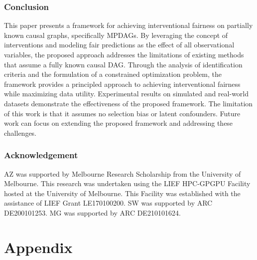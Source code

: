 \documentclass{article} %
\begin{document}
\section{Conclusion}
This paper presents a framework for achieving interventional fairness on partially known causal graphs, specifically MPDAGs. By leveraging the concept of interventions and modeling fair predictions as the effect of all observational variables, the proposed approach addresses the limitations of existing methods that assume a fully known causal DAG. Through the analysis of identification criteria and the formulation of a constrained optimization problem, the framework provides a principled approach to achieving interventional fairness while maximizing data utility. %
Experimental results on simulated and real-world datasets demonstrate the effectiveness of the proposed framework. The limitation of this work is that it assumes no selection bias or latent confounders. Future work can focus on extending the proposed framework and addressing these challenges.

\section{Acknowledgement}

AZ was supported by Melbourne Research Scholarship from the University of Melbourne. This research was undertaken using the LIEF HPC-GPGPU Facility hosted at the University of Melbourne. This Facility was established with the assistance of LIEF Grant LE170100200.
SW was supported by ARC DE200101253. 
MG was supported by ARC DE210101624.  %




\clearpage
\appendix

\part{Appendix} %
\parttoc
\end{document}
